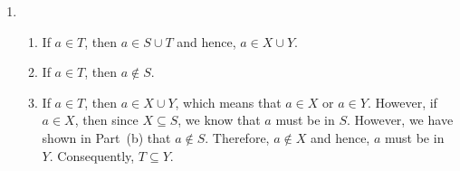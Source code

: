 \begin{enumerate}
\item \begin{enumerate}
\item If $a \in T$, then $a \in S \cup T$ and hence, $a \in X \cup Y$.

\item If $a \in T$, then $a \notin S$.

\item If $a \in T$, then $a \in X \cup Y$, which means that $a \in X$ or $a \in Y$.  However, if $a \in X$, then since $X \subseteq S$, we know that $a$ must be in $S$.  However, we have shown in Part~(b) that $a \notin S$.  Therefore, $a \notin X$ and hence, $a$ must be in $Y$.  
Consequently, $T \subseteq Y$.
\end{enumerate}



%
%
\end{enumerate}




